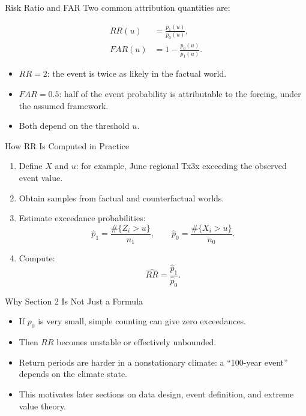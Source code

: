 \documentclass[aspectratio=169]{beamer}
\begin{document}
\begin{frame}{Risk Ratio and FAR}
  Two common attribution quantities are:

  \begin{align*}
    RR(u) &= \frac{p_1(u)}{p_0(u)}, \\
    FAR(u) &= 1 - \frac{p_0(u)}{p_1(u)}.
  \end{align*}

  \begin{itemize}
    \item $RR=2$: the event is twice as likely in the factual world.
    \item $FAR=0.5$: half of the event probability is attributable to the forcing, under the assumed framework.
    \item Both depend on the threshold $u$.
  \end{itemize}
\end{frame}

\begin{frame}{How RR Is Computed in Practice}
  \begin{enumerate}
    \item Define $X$ and $u$: for example, June regional Tx3x exceeding the observed event value.
    \item Obtain samples from factual and counterfactual worlds.
    \item Estimate exceedance probabilities:
      \[
        \hat p_1 = \frac{\#\{Z_i > u\}}{n_1}, \qquad
        \hat p_0 = \frac{\#\{X_i > u\}}{n_0}.
      \]
    \item Compute:
      \[
        \widehat{RR} = \frac{\hat p_1}{\hat p_0}.
      \]
  \end{enumerate}
\end{frame}

\begin{frame}{Why Section 2 Is Not Just a Formula}
  \begin{itemize}
    \item If $p_0$ is very small, simple counting can give zero exceedances.
    \item Then $RR$ becomes unstable or effectively unbounded.
    \item Return periods are harder in a nonstationary climate: a ``100-year event'' depends on the climate state.
    \item This motivates later sections on data design, event definition, and extreme value theory.
  \end{itemize}
\end{frame}
\end{document}
